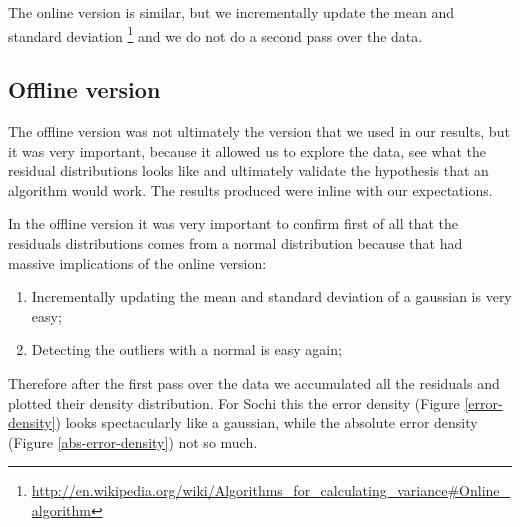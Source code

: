 \documentclass[minf,twoside,singlespacing,parskip,frontabs,notimes,12pt]{infthesis} %
\begin{document}
The online version is similar, but we incrementally update the mean and standard deviation \footnote{\url{http://en.wikipedia.org/wiki/Algorithms\_for\_calculating\_variance#Online\_algorithm}} and we do not do a second pass over the data. 

\subsection{Offline version}

The offline version was not ultimately the version that we used in our results, but it was very important, because it allowed us to explore the data, see what the residual distributions looks like and ultimately validate the hypothesis that an algorithm would work. The results produced were inline with our expectations.  

In the offline version it was very important to confirm first of all that the residuals distributions comes from a normal distribution because that had massive implications of the online version:
\begin{enumerate}
\item Incrementally updating the mean and standard deviation of a gaussian is very easy;
\item Detecting the outliers with a normal is easy again;
\end{enumerate}

Therefore after the first pass over the data we accumulated all the residuals and plotted their density distribution. For Sochi this  the error density (Figure \ref{error-density}) looks spectacularly like a gaussian, while the absolute error density (Figure \ref{abs-error-density}) not so much. 
\end{document}
